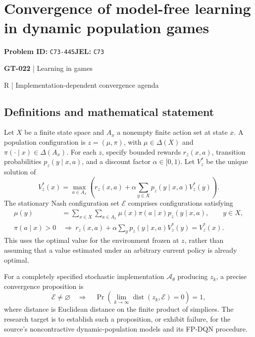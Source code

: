 \documentclass[11pt,a4paper]{article}
\begin{document}
\section*{Convergence of model-free learning in dynamic population games}
\textbf{Problem ID:} \texttt{C73-445}\quad \textbf{JEL:} \texttt{C73}\par
\label{problem:OP-0152}
\label{game:GT-022}
{\sffamily\small\color{muted}
{\sffamily\small\color{muted}\textbf{GT-022} | Learning in games\par R | Implementation-dependent convergence agenda\par}
\par}
\subsection*{Definitions and mathematical statement}
Let $X$ be a finite state space and $A_x$ a nonempty finite action set at state $x$. A population configuration is $z=(\mu,\pi)$, with $\mu\in\Delta(X)$ and $\pi(\cdot\mid x)\in\Delta(A_x)$. For each $z$, specify bounded rewards $r_z(x,a)$, transition probabilities $p_z(y\mid x,a)$, and a discount factor $\alpha\in[0,1)$. Let $V_z^*$ be the unique solution of
\[
 V_z^*(x)=\max_{a\in A_x}\left(r_z(x,a)+\alpha\sum_{y\in X}p_z(y\mid x,a)V_z^*(y)\right).
\]
The stationary Nash configuration set $\mathcal E$ comprises configurations satisfying
\begin{align*}
 \mu(y)&=\sum_{x\in X}\sum_{a\in A_x}\mu(x)\pi(a\mid x)p_z(y\mid x,a),\qquad y\in X,\\
 \pi(a\mid x)>0&\ \Longrightarrow\ 
 r_z(x,a)+\alpha\sum_y p_z(y\mid x,a)V_z^*(y)=V_z^*(x).
\end{align*}
This uses the optimal value for the environment frozen at $z$, rather than assuming that a value estimated under an arbitrary current policy is already optimal.

For a completely specified stochastic implementation $\mathcal A_\theta$ producing $z_k$, a precise convergence proposition is
\[
 \mathcal E\ne\varnothing\quad\Longrightarrow\quad
 \Pr\!\left(\lim_{k\to\infty}\operatorname{dist}(z_k,\mathcal E)=0\right)=1,
\]
where distance is Euclidean distance on the finite product of simplices. The research target is to establish such a proposition, or exhibit failure, for the source's noncontractive dynamic-population models and its FP-DQN procedure.
\end{document}
